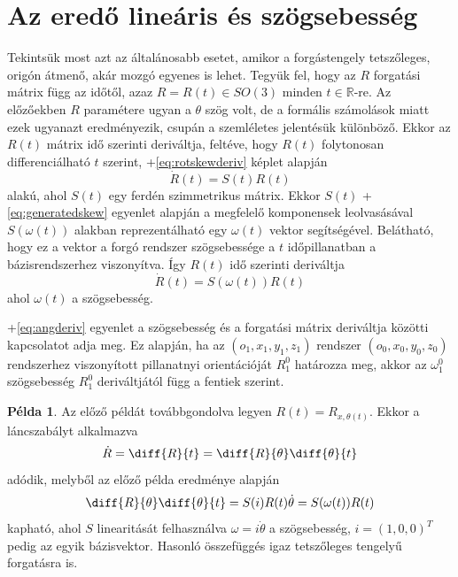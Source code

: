 \documentclass[12pt,a4paper]{report}
\theoremstyle{remark}
\theoremstyle{definition}
\newtheorem{pl}{Példa}[section]
\begin{document}
\section{Az eredő lineáris és szögsebesség}
Tekintsük most azt az általánosabb esetet, amikor a forgástengely tetszőleges, origón átmenő, akár mozgó egyenes is 
lehet. Tegyük fel, hogy az $R$ forgatási mátrix függ az időtől, azaz $R = R(t) \in SO(3)$ minden 
$t \in \mathbb{R}$-re. Az előzőekben $R$ paramétere ugyan a $\theta$ szög volt, de a formális számolások miatt ezek 
ugyanazt eredményezik, csupán a szemléletes jelentésük különböző. Ekkor az $R(t)$ mátrix idő szerinti deriváltja, 
feltéve, hogy $R(t)$ folytonosan differenciálható $t$ szerint, \az+\eqref{eq:rotskewderiv} képlet alapján
\begin{equation}
\dot{R}(t) = S(t)R(t)
\end{equation}
alakú, ahol $S(t)$ egy ferdén szimmetrikus mátrix. Ekkor $S(t)$ \az+\eqref{eq:generatedskew} egyenlet alapján a 
megfelelő komponensek leolvasásával $S(\omega(t))$ alakban reprezentálható egy $\omega(t)$ vektor segítségével. 
Belátható, hogy ez a vektor a forgó rendszer szögsebessége a $t$ időpillanatban a bázisrendszerhez viszonyítva. Így 
$R(t)$ idő szerinti deriváltja
\begin{equation} \label{eq:angderiv}
\dot{R}(t) = S(\omega(t))R(t)
\end{equation}
ahol $\omega(t)$ a szögsebesség.

\Az+\eqref{eq:angderiv} egyenlet a szögsebesség és a forgatási mátrix deriváltja közötti kapcsolatot adja meg. Ez 
alapján, ha az $(o_1, x_1, y_1, z_1)$ rendszer $(o_0, x_0, y_0, z_0)$ rendszerhez viszonyított pillanatnyi 
orientációját $R^{0}_{1}$ határozza meg, akkor az $\omega^{0}_{1}$ szögsebesség $R^{0}_{1}$ deriváltjától függ a 
fentiek szerint.

\begin{pl}
Az előző példát továbbgondolva legyen $R(t) = R_{x, \theta(t)}$. Ekkor a láncszabályt alkalmazva
\begin{equation}
\dot{R} = \diff{R}{t} = \diff{R}{\theta} \diff{\theta}{t}
\end{equation}
adódik, melyből az előző példa eredménye alapján
\begin{equation}
\diff{R}{\theta} \diff{\theta}{t} = S(i)R(t)\dot{\theta} = S(\omega(t))R(t)
\end{equation}
kapható, ahol $S$ linearitását felhasználva $\omega = i\dot{\theta}$ a szögsebesség, $i = (1, 0, 0)^T$ pedig az 
egyik bázisvektor. Hasonló összefüggés igaz tetszőleges tengelyű forgatásra is.
\end{pl}
\end{document}
